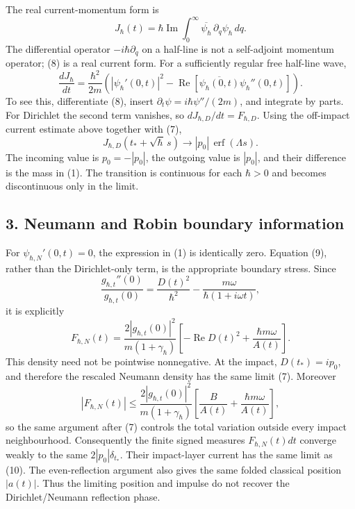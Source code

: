 \documentclass[11pt,a4paper]{article}
\begin{document}
The real current-momentum form is \[J_\hbar(t)=\hbar\operatorname{Im}
 \int_0^\infty\overline{\psi_\hbar}\,\partial_q\psi_\hbar\,dq.\tag{8}\]
The differential operator \(-i\hbar\partial_q\) on a half-line is not a
self-adjoint momentum operator; (8) is a real current form. For a
sufficiently regular free half-line wave, \[
 \frac{dJ_\hbar}{dt}
 =\frac{\hbar^2}{2m}\left(
     |\psi_\hbar'(0,t)|^2
    -\operatorname{Re}[\overline{\psi_\hbar(0,t)}
                                  \psi_\hbar''(0,t)]\right).\tag{9}
\] To see this, differentiate (8), insert
\(\partial_t\psi=i\hbar\psi''/(2m)\), and integrate by parts. For
Dirichlet the second term vanishes, so \(dJ_{\hbar,D}/dt=F_{\hbar,D}\).
Using the off-impact current estimate above together with (7), \[
 J_{\hbar,D}(t_*+\sqrt\hbar\,s)
 \longrightarrow |p_0|\,\operatorname{erf}(\Lambda s).\tag{10}
\] The incoming value is \(p_0=-|p_0|\), the outgoing value is
\(|p_0|\), and their difference is the mass in (1). The transition is
continuous for each \(\hbar>0\) and becomes discontinuous only in the
limit.

\subsection{3. Neumann and Robin boundary
information}\label{neumann-and-robin-boundary-information}

For \(\psi_{\hbar,N}'(0,t)=0\), the expression in (1) is identically
zero. Equation (9), rather than the Dirichlet-only term, is the
appropriate boundary stress. Since \[
 \frac{g_{\hbar,t}''(0)}{g_{\hbar,t}(0)}
 =\frac{D(t)^2}{\hbar^2}
   -\frac{m\omega}{\hbar(1+i\omega t)},
\] it is explicitly \[
 F_{\hbar,N}(t)=\frac{2|g_{\hbar,t}(0)|^2}{m(1+\gamma_\hbar)}
 \left[-\operatorname{Re}D(t)^2+\frac{\hbar m\omega}{A(t)}\right].
 \tag{11}
\] This density need not be pointwise nonnegative. At the impact,
\(D(t_*)=ip_0\), and therefore the rescaled Neumann density has the same
limit (7). Moreover \[
 |F_{\hbar,N}(t)|
 \le\frac{2|g_{\hbar,t}(0)|^2}{m(1+\gamma_\hbar)}
      \left[\frac{B}{A(t)}+\frac{\hbar m\omega}{A(t)}\right],
\] so the same argument after (7) controls the total variation outside
every impact neighbourhood. Consequently the finite signed measures
\(F_{\hbar,N}(t)dt\) converge weakly to the same \(2|p_0|\delta_{t_*}\).
Their impact-layer current has the same limit as (10). The
even-reflection argument also gives the same folded classical position
\(|a(t)|\). Thus the limiting position and impulse do not recover the
Dirichlet/Neumann reflection phase.
\end{document}
